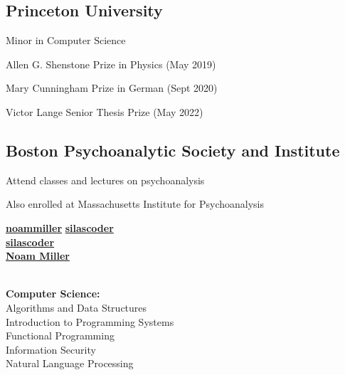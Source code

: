 \documentclass[a4paper]{MagicalCV}
\begin{document}
\lastupdated


\begin{minipage}[t]{0.33\textwidth} 


\subsection{Princeton University}
\vspace{\topsep}
\begin{tightemize}
\item Minor in Computer Science
\item Allen G. Shenstone Prize in Physics (May 2019)
\item Mary Cunningham Prize in German (Sept 2020)
\item Victor Lange Senior Thesis Prize (May 2022)
\end{tightemize}
\hspace{0.3cm}


\subsection{Boston Psychoanalytic Society and Institute}
\vspace{\topsep}
\begin{tightemize}
\item Attend classes and lectures on psychoanalysis
\item Also enrolled at Massachusetts Institute for Psychoanalysis
\end{tightemize}
\sectionsep


 \href{https://github.com/noammiller}{\bf noammiller}
 \href{https://github.com/silascoder}{\bf silascoder} \\
 \href{https://salsa.debian.org/silascoder}{\bf silascoder} \\
 \href{https://www.linkedin.com/in/noam-miller-8853a4154}{\bf Noam Miller}
\sectionsep

 \\
\textbf{Computer Science:} \\
Algorithms and Data Structures \\
Introduction to Programming Systems \\
Functional Programming \\
Information Security \\
Natural Language Processing \\


\end{minipage}
\end{document}
